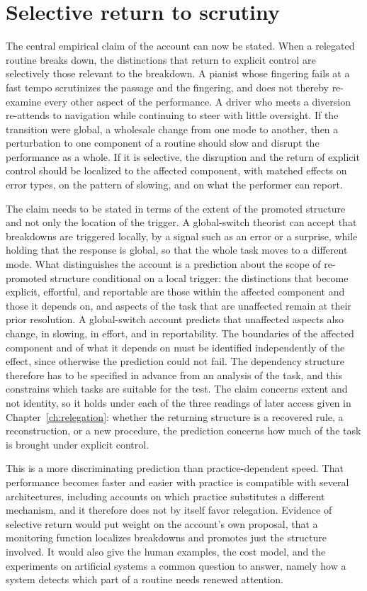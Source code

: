 \documentclass[11pt]{report}
\theoremstyle{remark}
\theoremstyle{definition}
\begin{document}
\section{Selective return to scrutiny}

The central empirical claim of the account can now be stated. When a relegated routine breaks down, the distinctions that return to explicit control are selectively those relevant to the breakdown. A pianist whose fingering fails at a fast tempo scrutinizes the passage and the fingering, and does not thereby re-examine every other aspect of the performance. A driver who meets a diversion re-attends to navigation while continuing to steer with little oversight. If the transition were global, a wholesale change from one mode to another, then a perturbation to one component of a routine should slow and disrupt the performance as a whole. If it is selective, the disruption and the return of explicit control should be localized to the affected component, with matched effects on error types, on the pattern of slowing, and on what the performer can report.

The claim needs to be stated in terms of the extent of the promoted structure and not only the location of the trigger. A global-switch theorist can accept that breakdowns are triggered locally, by a signal such as an error or a surprise, while holding that the response is global, so that the whole task moves to a different mode. What distinguishes the account is a prediction about the scope of re-promoted structure conditional on a local trigger: the distinctions that become explicit, effortful, and reportable are those within the affected component and those it depends on, and aspects of the task that are unaffected remain at their prior resolution. A global-switch account predicts that unaffected aspects also change, in slowing, in effort, and in reportability. The boundaries of the affected component and of what it depends on must be identified independently of the effect, since otherwise the prediction could not fail. The dependency structure therefore has to be specified in advance from an analysis of the task, and this constrains which tasks are suitable for the test. The claim concerns extent and not identity, so it holds under each of the three readings of later access given in Chapter~\ref{ch:relegation}: whether the returning structure is a recovered rule, a reconstruction, or a new procedure, the prediction concerns how much of the task is brought under explicit control.

This is a more discriminating prediction than practice-dependent speed. That performance becomes faster and easier with practice is compatible with several architectures, including accounts on which practice substitutes a different mechanism, and it therefore does not by itself favor relegation. Evidence of selective return would put weight on the account's own proposal, that a monitoring function localizes breakdowns and promotes just the structure involved. It would also give the human examples, the cost model, and the experiments on artificial systems a common question to answer, namely how a system detects which part of a routine needs renewed attention.
\end{document}

